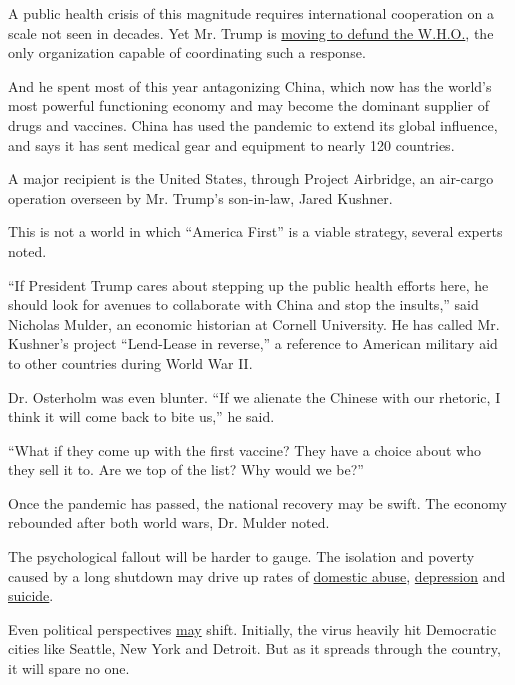 A public health crisis of this magnitude requires international
cooperation on a scale not seen in decades. Yet Mr. Trump is
\href{https://www.nytimes3xbfgragh.onion/2020/04/14/us/coronavirus-updates.html}{moving
to defund the W.H.O.}, the only organization capable of coordinating
such a response.

And he spent most of this year antagonizing China, which now has the
world's most powerful functioning economy and may become the dominant
supplier of drugs and vaccines. China has used the pandemic to extend
its global influence, and says it has sent medical gear and equipment to
nearly 120 countries.

A major recipient is the United States, through Project Airbridge, an
air-cargo operation overseen by Mr. Trump's son-in-law, Jared Kushner.

This is not a world in which ``America First'' is a viable strategy,
several experts noted.

``If President Trump cares about stepping up the public health efforts
here, he should look for avenues to collaborate with China and stop the
insults,'' said Nicholas Mulder, an economic historian at Cornell
University. He has called Mr. Kushner's project ``Lend-Lease in
reverse,'' a reference to American military aid to other countries
during World War II.

Dr. Osterholm was even blunter. ``If we alienate the Chinese with our
rhetoric, I think it will come back to bite us,'' he said.

``What if they come up with the first vaccine? They have a choice about
who they sell it to. Are we top of the list? Why would we be?''

Once the pandemic has passed, the national recovery may be swift. The
economy rebounded after both world wars, Dr. Mulder noted.

The psychological fallout will be harder to gauge. The isolation and
poverty caused by a long shutdown may drive up rates of
\href{https://www.nytimes3xbfgragh.onion/2020/04/17/nyregion/new-york-city-domestic-violence-coronavirus.html}{domestic
abuse},
\href{https://www.nytimes3xbfgragh.onion/2020/04/09/opinion/sunday/coronavirus-depression-anxiety.html}{depression}
and
\href{https://jamanetwork.com/journals/jamapsychiatry/fullarticle/2764584}{suicide}.

Even political perspectives
\href{https://time.com/5674850/2020-election-demographics/}{may} shift.
Initially, the virus heavily hit Democratic cities like Seattle, New
York and Detroit. But as it spreads through the country, it will spare
no one.

